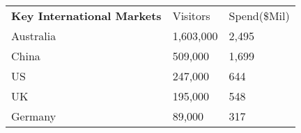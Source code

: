 \begin{tabular}[t]{p{5.4cm}p{0.9cm}p{1.2cm}}
 \textbf{Key International Markets} & Visitors & Spend(\$Mil) \\ 
 Australia & 1,603,000 & 2,495 \\ 
  China &   509,000 & 1,699 \\ 
  US &   247,000 &   644 \\ 
  UK &   195,000 &   548 \\ 
  Germany &    89,000 &   317 \\ 
  \end{tabular}
